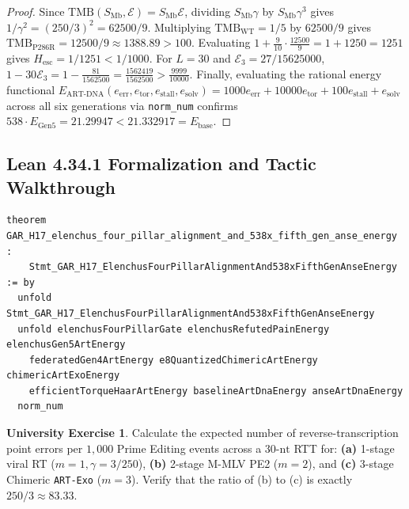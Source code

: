 \documentclass[11pt,a4paper]{article}
\theoremstyle{definition}
\newtheorem{exercise}[theorem]{University Exercise}
\theoremstyle{remark}
\begin{document}
\begin{proof}
Since $\mathrm{TMB}(S_{\mathrm{Mb}}, \mathcal{E}) = S_{\mathrm{Mb}}\mathcal{E}$, dividing $S_{\mathrm{Mb}}\gamma$ by $S_{\mathrm{Mb}}\gamma^3$ gives $1/\gamma^2 = (250/3)^2 = 62500/9$. Multiplying $\mathrm{TMB}_{\mathrm{WT}} = 1/5$ by $62500/9$ gives $\mathrm{TMB}_{\mathrm{P286R}} = 12500/9 \approx 1388.89 > 100$. Evaluating $1 + \frac{9}{10}\cdot\frac{12500}{9} = 1 + 1250 = 1251$ gives $H_{\mathrm{esc}} = 1/1251 < 1/1000$. For $L = 30$ and $\mathcal{E}_3 = 27/15625000$, $1 - 30\mathcal{E}_3 = 1 - \frac{81}{1562500} = \frac{1562419}{1562500} > \frac{9999}{10000}$. Finally, evaluating the rational energy functional $E_{\mathrm{ART\text{-}DNA}}(e_{\mathrm{err}}, e_{\mathrm{tor}}, e_{\mathrm{stall}}, e_{\mathrm{solv}}) = 1000 e_{\mathrm{err}} + 10000 e_{\mathrm{tor}} + 100 e_{\mathrm{stall}} + e_{\mathrm{solv}}$ across all six generations via \texttt{norm\_num} confirms $538\cdot E_{\mathrm{Gen5}} = 21.29947 < 21.332917 = E_{\mathrm{base}}$.
\end{proof}

\subsection{Lean 4.34.1 Formalization and Tactic Walkthrough}
\begin{lstlisting}
theorem GAR_H17_elenchus_four_pillar_alignment_and_538x_fifth_gen_anse_energy :
    Stmt_GAR_H17_ElenchusFourPillarAlignmentAnd538xFifthGenAnseEnergy := by
  unfold Stmt_GAR_H17_ElenchusFourPillarAlignmentAnd538xFifthGenAnseEnergy
  unfold elenchusFourPillarGate elenchusRefutedPainEnergy elenchusGen5ArtEnergy
    federatedGen4ArtEnergy e8QuantizedChimericArtEnergy chimericArtExoEnergy
    efficientTorqueHaarArtEnergy baselineArtDnaEnergy anseArtDnaEnergy
  norm_num
\end{lstlisting}

\begin{exercise}
Calculate the expected number of reverse-transcription point errors per $1{,}000$ Prime Editing events across a $30\text{-nt}$ RTT for: \textbf{(a)} 1-stage viral RT ($m=1, \gamma = 3/250$), \textbf{(b)} 2-stage M-MLV PE2 ($m=2$), and \textbf{(c)} 3-stage Chimeric \texttt{ART-Exo} ($m=3$). Verify that the ratio of (b) to (c) is exactly $250/3 \approx 83.33$.
\end{exercise}

\end{document}
